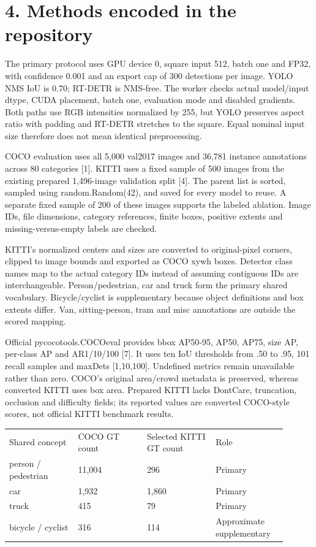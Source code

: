 \documentclass[10pt]{article}
\begin{document}
\section*{4. Methods encoded in the repository}
The primary protocol uses GPU device 0, square input 512, batch one and FP32, with confidence 0.001 and an export cap of 300 detections per image. YOLO NMS IoU is 0.70; RT-DETR is NMS-free. The worker checks actual model/input dtype, CUDA placement, batch one, evaluation mode and disabled gradients. Both paths use RGB intensities normalized by 255, but YOLO preserves aspect ratio with padding and RT-DETR stretches to the square. Equal nominal input size therefore does not mean identical preprocessing.


COCO evaluation uses all 5,000 val2017 images and 36,781 instance annotations across 80 categories [1]. KITTI uses a fixed sample of 500 images from the existing prepared 1,496-image validation split [4]. The parent list is sorted, sampled using random.Random(42), and saved for every model to reuse. A separate fixed sample of 200 of these images supports the labeled ablation. Image IDs, file dimensions, category references, finite boxes, positive extents and missing-versus-empty labels are checked.


KITTI's normalized centers and sizes are converted to original-pixel corners, clipped to image bounds and exported as COCO xywh boxes. Detector class names map to the actual category IDs instead of assuming contiguous IDs are interchangeable. Person/pedestrian, car and truck form the primary shared vocabulary. Bicycle/cyclist is supplementary because object definitions and box extents differ. Van, sitting-person, tram and misc annotations are outside the scored mapping.


Official pycocotools.COCOeval provides bbox AP50-95, AP50, AP75, size AP, per-class AP and AR1/10/100 [7]. It uses ten IoU thresholds from .50 to .95, 101 recall samples and maxDets [1,10,100]. Undefined metrics remain unavailable rather than zero. COCO's original area/crowd metadata is preserved, whereas converted KITTI uses box area. Prepared KITTI lacks DontCare, truncation, occlusion and difficulty fields; its reported values are converted COCO-style scores, not official KITTI benchmark results.


\begin{longtable}{p{0.225\linewidth}p{0.225\linewidth}p{0.225\linewidth}p{0.225\linewidth}}
Shared concept & COCO GT count & Selected KITTI GT count & Role \\
person / pedestrian & 11,004 & 296 & Primary \\
car & 1,932 & 1,860 & Primary \\
truck & 415 & 79 & Primary \\
bicycle / cyclist & 316 & 114 & Approximate supplementary \\
\end{longtable}
\clearpage
\end{document}
